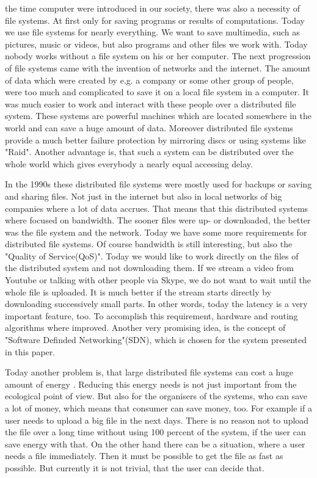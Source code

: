 \label{sec:intro}
 the time computer were introduced in our society, there was also a necessity of file systems. At first only for saving programs or results of computations. Today we use file systems for nearly everything. We want to save multimedia, such as pictures, music or videos, but also programs and other files we work with. Today nobody works without a file system on his or her computer. The next progression of file systems came with the invention of networks and the internet. The amount of data which were created by e.g. a company or some other group of people, were too much and complicated to save it on a local file system in a computer. It was much easier to work and interact with these people over a distributed file system. These systems are powerful machines which are located somewhere in the world and can save a huge amount of data. Moreover distributed file systems provide a much better failure protection by mirroring discs or using systems like "Raid". Another advantage is, that such a system can be distributed over the whole world which gives everybody a nearly equal accessing delay. 

In the 1990s these distributed file systems were mostly used for backups or saving and sharing files. Not just in the internet but also in local networks of big companies where a lot of data accrues. That means that this distributed systems where focused on bandwidth. The sooner files were up- or downloaded, the better was the file system and the network. Today we have some more requirements for distributed file systems. Of course bandwidth is still interesting, but also the "Quality of Service(QoS)". Today we would like to work directly on the files of the distributed system and not downloading them. If we stream a video from Youtube or talking with other people via Skype, we do not want to wait until the whole file is uploaded. It is much better if the stream starts directly by downloading successively small parts. In other words, today the latency is a very important feature, too. To accomplish this requirement, hardware and routing algorithms where improved. Another very promising idea, is the concept of "Software Definded Networking"(SDN), which is chosen for the system presented in this paper.

Today another problem is, that large distributed file systems can cost a huge amount of energy . Reducing this energy needs is not just important from the ecological point of view. But also for the organisers of the systems, who can save a lot of money, which means that consumer can save money, too. For example if a user needs to upload a big file in the next days. There is no reason not to upload the file over a long time without using 100 percent of the system, if the user can save energy with that. On the other hand there can be a situation, where a user needs a file immediately. Then it must be possible to get the file as fast as possible. But currently it is not trivial, that the user can decide that.  


